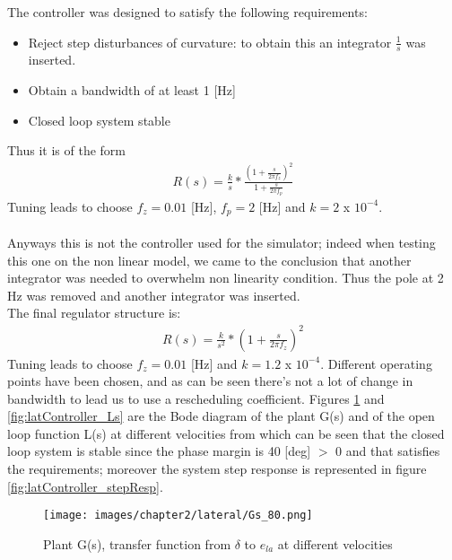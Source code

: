 \documentclass{report}
\begin{document}
The controller was designed to satisfy the following requirements:
\begin{itemize}
    \item Reject step disturbances of curvature: to obtain this an integrator $\frac{1}{s}$ was inserted.
    
    \item Obtain a bandwidth of at least 1 [Hz]
    
    \item Closed loop system stable
\end{itemize}
Thus it is of the form
\begin{equation*}
\begin{aligned}
R(s) = \frac{k}{s} * \frac{(1 + \frac{s}{2 \pi f_z})^2}{1 + \frac{s}{2 \pi f_p}}
\end{aligned}
\end{equation*}
Tuning leads to choose $f_z = 0.01$ [Hz], $f_p = 2$ [Hz] and $k = 2$ x $10^{-4}$.
\\\\Anyways this is not the controller used for the simulator; indeed when testing this one on the non linear model, we came to the conclusion that another integrator was needed to overwhelm non linearity condition. Thus the pole at 2 Hz was removed and another integrator was inserted. \\The final regulator structure is:
\begin{equation*}
\begin{aligned}
R(s) = \frac{k}{s^2} * (1 + \frac{s}{2 \pi f_z})^2
\end{aligned}
\end{equation*}
Tuning leads to choose $f_z = 0.01$ [Hz] and $k = 1.2$ x $10^{-4}$. Different operating points have been chosen, and as can be seen there's not a lot of change in bandwidth to lead us to use a rescheduling coefficient. Figures \ref{fig:latController_Gs} and \ref{fig:latController_Ls} are the Bode diagram of the plant G(s) and of the open loop function L(s) at different velocities from which can be seen that the closed loop system is stable since the phase margin is 40 [deg] $>$ 0 and that satisfies the requirements; moreover the system step response is represented in figure \ref{fig:latController_stepResp}. 

\begin{figure}[h!]
    \centering
    \texttt{[image: images/chapter2/lateral/Gs\_80.png]}
    \caption{Plant G(s), transfer function from $\delta$ to $e_{la}$ at different velocities}
    \label{fig:latController_Gs}
\end{figure}
\end{document}
